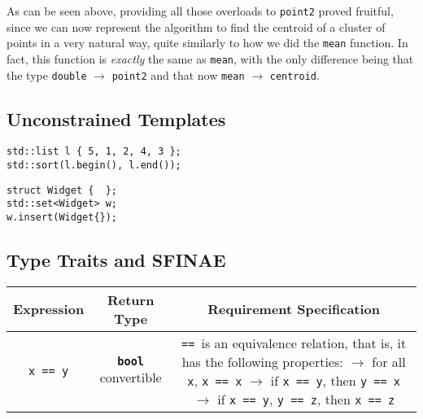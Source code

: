 

\noindent As can be seen above, providing all those overloads to \texttt{point2} proved fruitful, since we can now represent the algorithm to find the centroid of a cluster of points in a very natural way, quite similarly to how we did the \texttt{mean} function. In fact, this function is \emph{exactly} the same as \texttt{mean}, with the only difference being that the type \texttt{double} $\rightarrow$ \texttt{point2} and that now \texttt{mean} $\rightarrow$ \texttt{centroid}.

\subsection{Unconstrained Templates} \label{sec:unconstrained_templates}

    

    \begin{lstlisting}
std::list l { 5, 1, 2, 4, 3 };
std::sort(l.begin(), l.end()); \end{lstlisting}

    \begin{lstlisting}
struct Widget {  };
std::set<Widget> w;
w.insert(Widget{}); \end{lstlisting}

    

\subsection{Type Traits and SFINAE} \label{sec:type_traits_and_sfinae}

    \begin{table}[h]
    \begin{tabular}{ccc}
        \toprule
        \bf{Expression} & \bf{Return Type} & \bf{Requirement Specification} \\
        \midrule
        \texttt{x == y} & \textbf{\texttt{bool}} convertible & \makecell[l]{\texttt{==}\, is an equivalence relation, that is,\\
                                                                it has the following properties:\\
                                                                $\rightarrow$ for all \texttt{x}, \texttt{x == x}\\
                                                                $\rightarrow$ if \texttt{x == y}, then \texttt{y == x}\\
                                                                $\rightarrow$ if \texttt{x == y}, \texttt{y == z}, then \texttt{x == z}} \\
        \bottomrule
    \end{tabular}
    \end{table}

